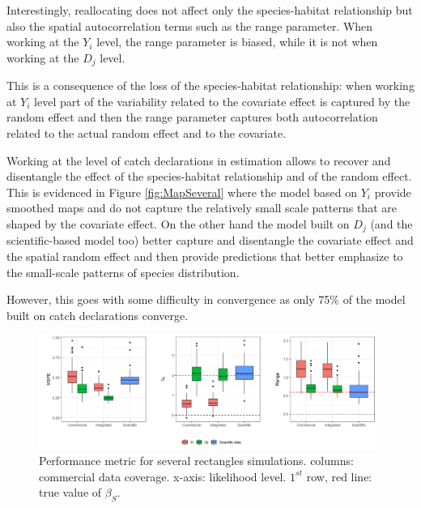 \documentclass[
  english,
  man]{apa6}
\begin{document}
Interestingly, reallocating does not affect only the species-habitat relationship but also the spatial autocorrelation terms such as the range parameter. When working at the \(Y_i\) level, the range parameter is biased, while it is not when working at the \(D_j\) level.

This is a consequence of the loss of the species-habitat relationship: when working at \(Y_i\) level part of the variability related to the covariate effect is captured by the random effect and then the range parameter captures both autocorrelation related to the actual random effect and to the covariate.

Working at the level of catch declarations in estimation allows to recover and disentangle the effect of the species-habitat relationship and of the random effect. This is evidenced in Figure \ref{fig:MapSeveral} where the model based on \(Y_i\) provide smoothed maps and do not capture the relatively small scale patterns that are shaped by the covariate effect. On the other hand the model built on \(D_j\) (and the scientific-based model too) better capture and disentangle the covariate effect and the spatial random effect and then provide predictions that better emphasize to the small-scale patterns of species distribution.

However, this goes with some difficulty in convergence as only 75\% of the model built on catch declarations converge.

\begin{figure}
\centering
\includegraphics{images/Perf.metric_multiple_square.png}
\caption{\label{fig:PerfMetricSeveral} Performance metric for several rectangles simulations. columns: commercial data coverage. x-axis: likelihood level. \(1^{st}\) row, red line: true value of \(\beta_S\).}
\end{figure}
\end{document}
